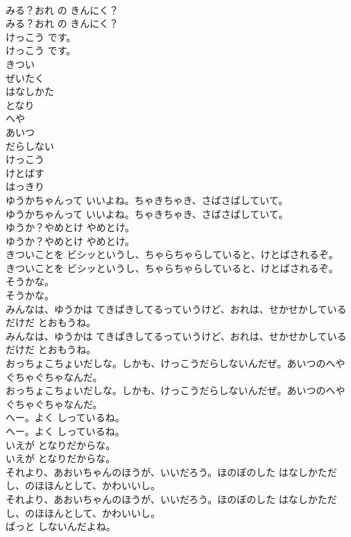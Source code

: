 \documentclass[8pt]{extreport}
\begin{document}
\begin{CJK}{UTF8}{min}
\\	みる？おれ の きんにく？	
\\	みる？おれ の きんにく？ 
\\	けっこう です。	
\\	けっこう です。 
\\	きつい
\\	ぜいたく
\\	はなしかた
\\	となり
\\	へや
\\	あいつ
\\	だらしない
\\	けっこう
\\	けとばす
\\	はっきり
\\	ゆうかちゃんって いいよね。ちゃきちゃき、さばさばしていて。	
\\	ゆうかちゃんって いいよね。ちゃきちゃき、さばさばしていて。 
\\	ゆうか？やめとけ やめとけ。	
\\	ゆうか？やめとけ やめとけ。 
\\	きついことを ビシッというし、ちゃらちゃらしていると、けとばされるぞ。	
\\	きついことを ビシッというし、ちゃらちゃらしていると、けとばされるぞ。 
\\	そうかな。	
\\	そうかな。 
\\	みんなは、ゆうかは てきぱきしてるっていうけど、おれは、せかせかしているだけだ とおもうね。	
\\	みんなは、ゆうかは てきぱきしてるっていうけど、おれは、せかせかしているだけだ とおもうね。 
\\	おっちょこちょいだしな。しかも、けっこうだらしないんだぜ。あいつのへや ぐちゃぐちゃなんだ。	
\\	おっちょこちょいだしな。しかも、けっこうだらしないんだぜ。あいつのへや ぐちゃぐちゃなんだ。 
\\	へー。よく しっているね。	
\\	へー。よく しっているね。 
\\	いえが となりだからな。	
\\	いえが となりだからな。 
\\	それより、あおいちゃんのほうが、いいだろう。ほのぼのした はなしかただし、のほほんとして、かわいいし。	
\\	それより、あおいちゃんのほうが、いいだろう。ほのぼのした はなしかただし、のほほんとして、かわいいし。 
\\	ぱっと しないんだよね。	

\end{CJK}
\end{document}
